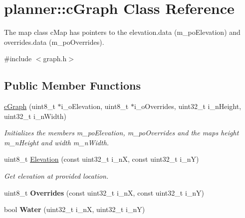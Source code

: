 \hypertarget{classplanner_1_1c_graph}{}\section{planner\+:\+:c\+Graph Class Reference}
\label{classplanner_1_1c_graph}


The map class c\+Map has pointers to the elevation.\+data (m\+\_\+po\+Elevation) and overrides.\+data (m\+\_\+po\+Overrides).  




{\ttfamily \#include $<$graph.\+h$>$}

\subsection*{Public Member Functions}
\begin{DoxyCompactItemize}
\item 
\mbox{\label{classplanner_1_1c_graph_a32f2ed78e1293e8866da80a558193097}} 
\mbox{\hyperlink{classplanner_1_1c_graph_a32f2ed78e1293e8866da80a558193097}{c\+Graph}} (uint8\+\_\+t $\ast$i\+\_\+o\+Elevation, uint8\+\_\+t $\ast$i\+\_\+o\+Overrides, uint32\+\_\+t i\+\_\+n\+Height, uint32\+\_\+t i\+\_\+n\+Width)
\begin{DoxyCompactList}\small\item\em Initializes the members m\+\_\+po\+Elevation, m\+\_\+po\+Overrides and the maps height m\+\_\+n\+Height and width m\+\_\+n\+Width. \end{DoxyCompactList}\item 
uint8\+\_\+t \mbox{\hyperlink{classplanner_1_1c_graph_a16d0c9ffe6f353d534bcdc72e84612b5}{Elevation}} (const uint32\+\_\+t i\+\_\+nX, const uint32\+\_\+t i\+\_\+nY)
\begin{DoxyCompactList}\small\item\em Get elevation at provided location. \end{DoxyCompactList}\item 
\mbox{\label{classplanner_1_1c_graph_aeff58ae5d8731b592a922058ce37074d}} 
uint8\+\_\+t {\bfseries Overrides} (const uint32\+\_\+t i\+\_\+nX, const uint32\+\_\+t i\+\_\+nY)
\item 
\mbox{\label{classplanner_1_1c_graph_a6d951e9b0e004bdd251c2a3c6498b0f4}} 
bool {\bfseries Water} (uint32\+\_\+t i\+\_\+nX, uint32\+\_\+t i\+\_\+nY)

\end{DoxyCompactItemize}
